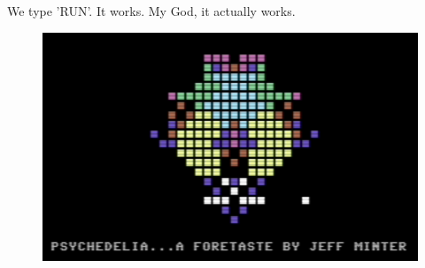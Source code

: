 We type 'RUN'. It works. My God, it actually works.

\begin{figure}[H]
    \centering
    \begin{adjustbox}{width=9cm,center}
      \includegraphics[width=12cm]{src/listing/itworks.png}%
    \end{adjustbox}
\end{figure}

